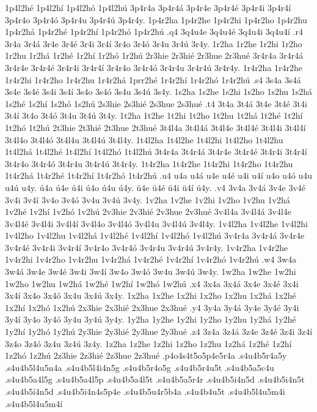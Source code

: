 {1p4l2h^^e9 1p4l2h^^ed 1p4l2h^^f3 1p4l2h^^fa
3p4r4a 3p4r4^^e1 3p4r4e 3p4r4^^e9 3p4r4i 3p4r4^^ed 3p4r4o 3p4r4^^f3 3p4r4u
3p4r4^^fa 3p4r4y. 1p4r2ha 1p4r2he 1p4r2hi 1p4r2ho 1p4r2hu 1p4r2h^^e1
1p4r2h^^e9 1p4r2h^^ed 1p4r2h^^f3 1p4r2h^^fa
.q4 3q4u4e 3q4u4^^e9 3q4u4i 3q4u4^^ed
.r4 3r4a 3r4^^e1 3r4e 3r4^^e9 3r4i 3r4^^ed 3r4o 3r4^^f3 3r4u 3r4^^fa 3r4y.
1r2ha 1r2he 1r2hi 1r2ho 1r2hu 1r2h^^e1 1r2h^^e9 1r2h^^ed 1r2h^^f3 1r2h^^fa
2r3hie 2r3hi^^e9 2r3hue 2r3hu^^e9
3r4r4a 3r4r4^^e1 3r4r4e 3r4r4^^e9 3r4r4i 3r4r4^^ed 3r4r4o 3r4r4^^f3 3r4r4u
3r4r4^^fa 3r4r4y. 1r4r2ha 1r4r2he 1r4r2hi 1r4r2ho 1r4r2hu 1r4r2h^^e1
1prr2h^^e9 1r4r2h^^ed 1r4r2h^^f3 1r4r2h^^fa
.s4 3s4a 3s4^^e1 3s4e 3s4^^e9 3s4i 3s4^^ed 3s4o 3s4^^f3 3s4u 3s4^^fa 3s4y.
1s2ha 1s2he 1s2hi 1s2ho 1s2hu 1s2h^^e1 1s2h^^e9 1s2h^^ed 1s2h^^f3 1s2h^^fa
2s3hie 2s3hi^^e9 2s3hue 2s3hu^^e9
.t4 3t4a 3t4^^e1 3t4e 3t4^^e9 3t4i 3t4^^ed 3t4o 3t4^^f3 3t4u 3t4^^fa 3t4y.
1t2ha 1t2he 1t2hi 1t2ho 1t2hu 1t2h^^e1 1t2h^^e9 1t2h^^ed 1t2h^^f3 1t2h^^fa
2t3hie 2t3hi^^e9 2t3hue 2t3hu^^e9
3t4l4a 3t4l4^^e1 3t4l4e 3t4l4^^e9 3t4l4i 3t4l4^^ed 3t4l4o 3t4l4^^f3 3t4l4u
3t4l4^^fa 3t4l4y. 1t4l2ha 1t4l2he 1t4l2hi 1t4l2ho 1t4l2hu 1t4l2h^^e1
1t4l2h^^e9 1t4l2h^^ed 1t4l2h^^f3 1t4l2h^^fa
3t4r4a 3t4r4^^e1 3t4r4e 3t4r4^^e9 3t4r4i 3t4r4^^ed 3t4r4o 3t4r4^^f3 3t4r4u
3t4r4^^fa 3t4r4y. 1t4r2ha 1t4r2he 1t4r2hi 1t4r2ho 1t4r2hu 1t4r2h^^e1
1t4r2h^^e9 1t4r2h^^ed 1t4r2h^^f3 1t4r2h^^fa
.u4 u4a u4^^e1 u4e u4^^e9 u4i u4^^ed u4o u4^^f3 u4u u4^^fa u4y.
^^fa4a ^^fa4e ^^fa4i ^^fa4o  ^^fa4u ^^fa4y.
^^fc4e ^^fc4^^e9 ^^fc4i ^^fc4^^ed ^^fc4y.
.v4 3v4a 3v4^^e1 3v4e 3v4^^e9 3v4i 3v4^^ed 3v4o 3v4^^f3 3v4u 3v4^^fa 3v4y.
1v2ha 1v2he 1v2hi 1v2ho 1v2hu 1v2h^^e1 1v2h^^e9 1v2h^^ed 1v2h^^f3 1v2h^^fa
2v3hie 2v3hi^^e9 2v3hue 2v3hu^^e9
3v4l4a 3v4l4^^e1 3v4l4e 3v4l4^^e9 3v4l4i 3v4l4^^ed 3v4l4o 3v4l4^^f3 3v4l4u
3v4l4^^fa 3v4l4y. 1v4l2ha 1v4l2he 1v4l2hi 1v4l2ho 1v4l2hu 1v4l2h^^e1
1v4l2h^^e9 1v4l2h^^ed 1v4l2h^^f3 1v4l2h^^fa
3v4r4a 3v4r4^^e1 3v4r4e 3v4r4^^e9 3v4r4i 3v4r4^^ed 3v4r4o 3v4r4^^f3 3v4r4u
3v4r4^^fa 3v4r4y. 1v4r2ha 1v4r2he 1v4r2hi 1v4r2ho 1v4r2hu 1v4r2h^^e1
1v4r2h^^e9 1v4r2h^^ed 1v4r2h^^f3 1v4r2h^^fa
.w4 3w4a 3w4^^e1 3w4e 3w4^^e9 3w4i 3w4^^ed 3w4o 3w4^^f3 3w4u 3w4^^fa 3w4y.
1w2ha 1w2he 1w2hi 1w2ho 1w2hu 1w2h^^e1 1w2h^^e9 1w2h^^ed 1w2h^^f3 1w2h^^fa
.x4 3x4a 3x4^^e1 3x4e 3x4^^e9 3x4i 3x4^^ed 3x4o 3x4^^f3 3x4u 3x4^^fa 3x4y.
1x2ha 1x2he 1x2hi 1x2ho 1x2hu 1x2h^^e1 1x2h^^e9 1x2h^^ed 1x2h^^f3 1x2h^^fa
2x3hie 2x3hi^^e9 2x3hue 2x3hu^^e9
.y4 3y4a 3y4^^e1 3y4e 3y4^^e9 3y4i 3y4^^ed 3y4o 3y4^^f3 3y4u 3y4^^fa 3y4y.
1y2ha 1y2he 1y2hi 1y2ho 1y2hu 1y2h^^e1 1y2h^^e9 1y2h^^ed 1y2h^^f3 1y2h^^fa
2y3hie 2y3hi^^e9 2y3hue 2y3hu^^e9
.z4 3z4a 3z4^^e1 3z4e 3z4^^e9 3z4i 3z4^^ed 3z4o 3z4^^f3 3z4u 3z4^^fa 3z4y.
1z2ha 1z2he 1z2hi 1z2ho 1z2hu 1z2h^^e1 1z2h^^e9 1z2h^^ed 1z2h^^f3 1z2h^^fa
2z3hie 2z3hi^^e9 2z3hue 2z3hu^^e9
.p4o4s4t5o5p4e5r4a
.s4u4b5r4a5y
.s4u4b5l4u5n4a
.s4u4b5l4i4n5g
.s4u4b5r4o5g
.s4u4b5r4u5t
.s4u4b5a5c4u
.s4u4b5a4l5g
.s4u4b5a4l5p
.s4u4b5a4l5t
.s4u4b5a5r4r
.s4u4b5i4n5d
.s4u4b5i4n5t
.s4u4b5^^ed4n5d
.s4u4b5i4n4s5p4e
.s4u4b5u4r5b4a
.s4u4b4u5t
.s4u4b5l4u5m4i
.s4u4b5l4u5m4^^ed
}
